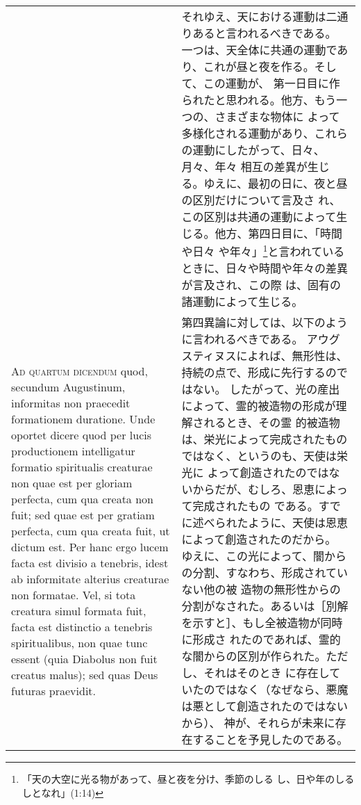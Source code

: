 \documentclass[10pt]{jsarticle} %
\begin{document}
\begin{longtable}{p{21em}p{21em}}
&

それゆえ、天における運動は二通りあると言われるべきである。
一つは、天全体に共通の運動であり、これが昼と夜を作る。そして、この運動が、
 第一日目に作られたと思われる。他方、もう一つの、さまざまな物体に
 よって多様化される運動があり、これらの運動にしたがって、日々、月々、年々
 相互の差異が生じる。ゆえに、最初の日に、夜と昼の区別だけについて言及さ
 れ、この区別は共通の運動によって生じる。他方、第四日目に、「時間や日々
 や年々」\footnote{「天の大空に光る物があって、昼と夜を分け、季節のしる
 し、日や年のしるしとなれ」(1:14)}と言われているときに、日々や時間や年々の差異が言及され、この際
 は、固有の諸運動によって生じる。

\\


{\scshape Ad quartum dicendum} quod, secundum
Augustinum, informitas non praecedit formationem duratione. Unde oportet
dicere quod per lucis productionem intelligatur formatio spiritualis
creaturae non quae est per gloriam perfecta, cum qua creata non fuit;
sed quae est per gratiam perfecta, cum qua creata fuit, ut dictum
est. Per hanc ergo lucem facta est divisio a tenebris, idest ab
informitate alterius creaturae non formatae. Vel, si tota creatura simul
formata fuit, facta est distinctio a tenebris spiritualibus, non quae
tunc essent (quia Diabolus non fuit creatus malus); sed quas Deus
futuras praevidit.

&

第四異論に対しては、以下のように言われるべきである。
アウグスティヌスによれば、無形性は、持続の点で、形成に先行するのではない。
 したがって、光の産出によって、霊的被造物の形成が理解されるとき、その霊
 的被造物は、栄光によって完成されたものではなく、というのも、天使は栄光に
 よって創造されたのではないからだが、むしろ、恩恵によって完成されたもの
 である。すでに述べられたように、天使は恩恵によって創造されたのだから。
 ゆえに、この光によって、闇からの分割、すなわち、形成されていない他の被
 造物の無形性からの分割がなされた。あるいは［別解を示すと］、もし全被造物が同時に形成さ
 れたのであれば、霊的な闇からの区別が作られた。ただし、それはそのとき
 に存在していたのではなく（なぜなら、悪魔は悪として創造されたのではないから）、
 神が、それらが未来に存在することを予見したのである。




\end{longtable}
\end{document}
